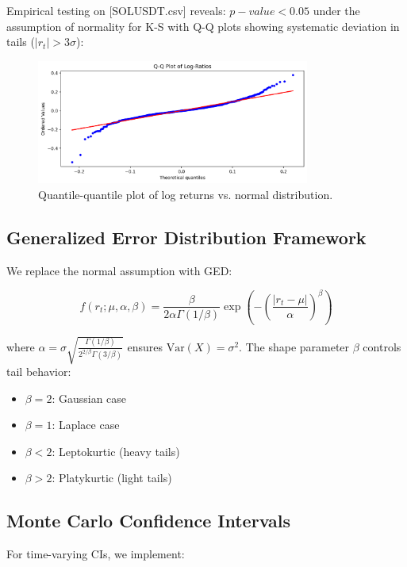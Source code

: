 \documentclass[12pt]{article}
\begin{document}
Empirical testing on [SOLUSDT.csv] reveals:
$p-value < 0.05$ under the assumption of normality for K-S with Q-Q plots showing systematic deviation in tails ($|r_t| > 3\sigma$):

\begin{figure}[H]
    \centering
    \includegraphics[width=0.8\textwidth]{qq_plot2.png}
    \caption{Quantile-quantile plot of log returns vs. normal distribution.}
    \label{fig:qq}
\end{figure}

\subsection{Generalized Error Distribution Framework}
We replace the normal assumption with GED:

\begin{equation}
    f(r_t; \mu, \alpha, \beta) = \frac{\beta}{2\alpha\Gamma(1/\beta)} \exp\left(-\left(\frac{|r_t-\mu|}{\alpha}\right)^\beta\right)
\end{equation}

where $\alpha = \sigma \sqrt{\frac{\Gamma(1/\beta)}{2^{2/\beta}\Gamma(3/\beta)}}$ ensures $\text{Var}(X) = \sigma^2$. The shape parameter $\beta$ controls tail behavior:

\begin{itemize}
    \item $\beta = 2$: Gaussian case
    \item $\beta = 1$: Laplace case
    \item $\beta < 2$: Leptokurtic (heavy tails)
    \item $\beta > 2$: Platykurtic (light tails)
\end{itemize}

\subsection{Monte Carlo Confidence Intervals}
For time-varying CIs, we implement:
\end{document}

